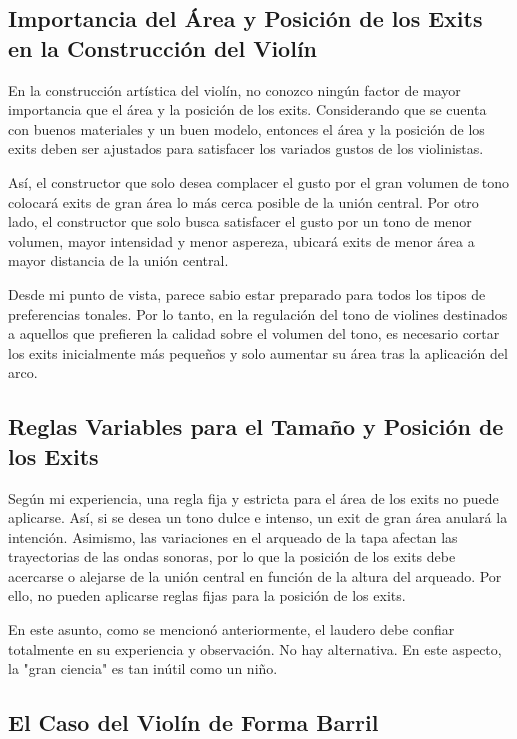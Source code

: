 \documentclass[12pt]{book}
\begin{document}
\subsection*{Importancia del Área y Posición de los Exits en la Construcción del Violín}

En la construcción artística del violín, no conozco ningún factor de mayor importancia que el área y la posición de los exits. Considerando que se cuenta con buenos materiales y un buen modelo, entonces el área y la posición de los exits deben ser ajustados para satisfacer los variados gustos de los violinistas.

Así, el constructor que solo desea complacer el gusto por el gran volumen de tono colocará exits de gran área lo más cerca posible de la unión central. Por otro lado, el constructor que solo busca satisfacer el gusto por un tono de menor volumen, mayor intensidad y menor aspereza, ubicará exits de menor área a mayor distancia de la unión central.

Desde mi punto de vista, parece sabio estar preparado para todos los tipos de preferencias tonales. Por lo tanto, en la regulación del tono de violines destinados a aquellos que prefieren la calidad sobre el volumen del tono, es necesario cortar los exits inicialmente más pequeños y solo aumentar su área tras la aplicación del arco. 

\subsection*{Reglas Variables para el Tamaño y Posición de los Exits}

Según mi experiencia, una regla fija y estricta para el área de los exits no puede aplicarse. Así, si se desea un tono dulce e intenso, un exit de gran área anulará la intención. Asimismo, las variaciones en el arqueado de la tapa afectan las trayectorias de las ondas sonoras, por lo que la posición de los exits debe acercarse o alejarse de la unión central en función de la altura del arqueado. Por ello, no pueden aplicarse reglas fijas para la posición de los exits.

En este asunto, como se mencionó anteriormente, el laudero debe confiar totalmente en su experiencia y observación. No hay alternativa. En este aspecto, la "gran ciencia" es tan inútil como un niño. 

\subsection*{El Caso del Violín de Forma Barril}
\end{document}
